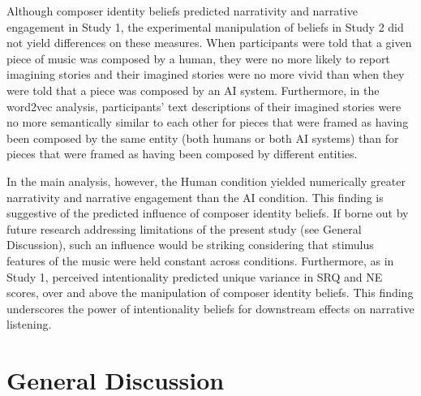 \documentclass[12pt,twoside]{reedthesis}
\begin{document}
Although composer identity beliefs predicted narrativity and narrative engagement in Study 1, the experimental manipulation of beliefs in Study 2 did not yield differences on these measures. When participants were told that a given piece of music was composed by a human, they were no more likely to report imagining stories and their imagined stories were no more vivid than when they were told that a piece was composed by an AI system. Furthermore, in the word2vec analysis, participants’ text descriptions of their imagined stories were no more semantically similar to each other for pieces that were framed as having been composed by the same entity (both humans or both AI systems) than for pieces that were framed as having been composed by different entities. 

In the main analysis, however, the Human condition yielded numerically greater narrativity and narrative engagement than the AI condition. This finding is suggestive of the predicted influence of composer identity beliefs. If borne out by future research addressing limitations of the present study (see General Discussion), such an influence would be striking considering that stimulus features of the music were held constant across conditions. Furthermore, as in Study 1, perceived intentionality predicted unique variance in SRQ and NE scores, over and above the manipulation of composer identity beliefs. This finding underscores the power of intentionality beliefs for downstream effects on narrative listening. 

\chapter*{General Discussion}






  \backmatter %
\end{document}

